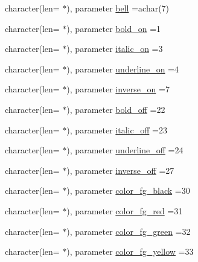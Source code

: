 \begin{DoxyCompactItemize}
\item 
character(len= $\ast$), parameter \mbox{\hyperlink{namespacem__escape_a2cd9c30d3783af9d1f74a50e7f1dbd7f}{bell}} =achar(7)
\item 
character(len= $\ast$), parameter \mbox{\hyperlink{namespacem__escape_a8f30470c66af08cf881d9afe23357a03}{bold\+\_\+on}} =\textquotesingle{}1\textquotesingle{}
\item 
character(len= $\ast$), parameter \mbox{\hyperlink{namespacem__escape_a5bd07ea0cedbfd7d0e04b3b0be74821f}{italic\+\_\+on}} =\textquotesingle{}3\textquotesingle{}
\item 
character(len= $\ast$), parameter \mbox{\hyperlink{namespacem__escape_a6f4bcc5f8acb0683ed6d8e05c0100daa}{underline\+\_\+on}} =\textquotesingle{}4\textquotesingle{}
\item 
character(len= $\ast$), parameter \mbox{\hyperlink{namespacem__escape_afacdc9d33171b768ee026b1eb6726f8a}{inverse\+\_\+on}} =\textquotesingle{}7\textquotesingle{}
\item 
character(len= $\ast$), parameter \mbox{\hyperlink{namespacem__escape_a978fe9a5d07621c57c3163d8a7a62118}{bold\+\_\+off}} =\textquotesingle{}22\textquotesingle{}
\item 
character(len= $\ast$), parameter \mbox{\hyperlink{namespacem__escape_a93fc5a4e6f0ed044c9f6cf29412a05cb}{italic\+\_\+off}} =\textquotesingle{}23\textquotesingle{}
\item 
character(len= $\ast$), parameter \mbox{\hyperlink{namespacem__escape_a9e36a1a9bd4a64702ecef4a2e3d592b9}{underline\+\_\+off}} =\textquotesingle{}24\textquotesingle{}
\item 
character(len= $\ast$), parameter \mbox{\hyperlink{namespacem__escape_affae80c7d63858227a9f3134e6191f96}{inverse\+\_\+off}} =\textquotesingle{}27\textquotesingle{}
\item 
character(len= $\ast$), parameter \mbox{\hyperlink{namespacem__escape_a6c7b72b2cfc0a6ec7fc4080ad6750d99}{color\+\_\+fg\+\_\+black}} =\textquotesingle{}30\textquotesingle{}
\item 
character(len= $\ast$), parameter \mbox{\hyperlink{namespacem__escape_a35eecf0fb916821d94b9c47b2045fe44}{color\+\_\+fg\+\_\+red}} =\textquotesingle{}31\textquotesingle{}
\item 
character(len= $\ast$), parameter \mbox{\hyperlink{namespacem__escape_aeab9b03c1de2c6fb13031c9ca55f9105}{color\+\_\+fg\+\_\+green}} =\textquotesingle{}32\textquotesingle{}
\item 
character(len= $\ast$), parameter \mbox{\hyperlink{namespacem__escape_accc5b67f05d8a2b02ca6f4a0ba38e581}{color\+\_\+fg\+\_\+yellow}} =\textquotesingle{}33\textquotesingle{}

\end{DoxyCompactItemize}
